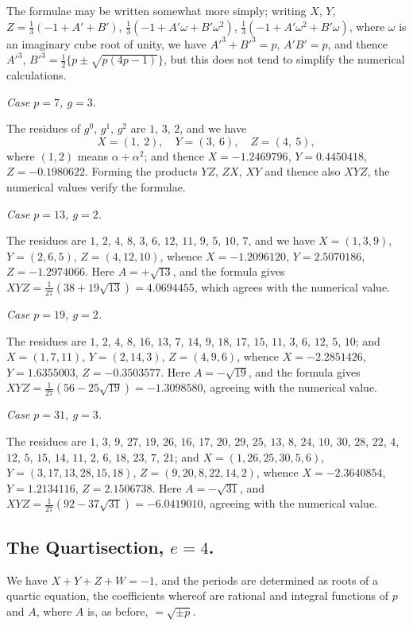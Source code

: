 \documentclass[12pt,a4paper]{article}
\theoremstyle{plain}
\begin{document}
The formulae may be written somewhat more simply; writing
$X$, $Y$, $Z = \frac{1}{3}(-1+A'+B')$, $\frac{1}{3}(-1+A'\omega+B'\omega^2)$,
$\frac{1}{3}(-1+A'\omega^2+B'\omega)$, where $\omega$ is an imaginary cube root of
unity, we have $A'^3+B'^3=p$, $A'B'=p$, and thence
$A'^3$, $B'^3 = \frac{1}{2}\{p \pm \sqrt{p(4p-1)}\}$, but this does not tend to
simplify the numerical calculations.

\textit{Case $p=7$, $g=3$.}

The residues of $g^0$, $g^1$, $g^2$ are $1$, $3$, $2$, and we have
\[
X = (1,\ 2),\quad Y = (3,\ 6),\quad Z = (4,\ 5),
\]
where $(1,2)$ means $\alpha+\alpha^2$; and thence $X=-1.2469796$,
$Y=0.4450418$, $Z=-0.1980622$. Forming the products $YZ$, $ZX$, $XY$
and thence also $XYZ$, the numerical values verify the formulae.

\textit{Case $p=13$, $g=2$.}

The residues are $1$, $2$, $4$, $8$, $3$, $6$, $12$, $11$, $9$, $5$, $10$, $7$,
and we have $X=(1,3,9)$, $Y=(2,6,5)$, $Z=(4,12,10)$, whence
$X=-1.2096120$, $Y=2.5070186$, $Z=-1.2974066$. Here $A=+\sqrt{13}$,
and the formula gives $XYZ=\frac{1}{27}(38+19\sqrt{13})=4.0694455$,
which agrees with the numerical value.

\textit{Case $p=19$, $g=2$.}

The residues are $1$, $2$, $4$, $8$, $16$, $13$, $7$, $14$, $9$, $18$, $17$,
$15$, $11$, $3$, $6$, $12$, $5$, $10$; and $X=(1,7,11)$, $Y=(2,14,3)$,
$Z=(4,9,6)$, whence $X=-2.2851426$, $Y=1.6355003$,
$Z=-0.3503577$. Here $A=-\sqrt{19}$, and the formula gives
$XYZ=\frac{1}{27}(56-25\sqrt{19})=-1.3098580$, agreeing with the numerical
value.

\textit{Case $p=31$, $g=3$.}

The residues are $1$, $3$, $9$, $27$, $19$, $26$, $16$, $17$, $20$, $29$,
$25$, $13$, $8$, $24$, $10$, $30$, $28$, $22$, $4$, $12$, $5$, $15$, $14$, $11$,
$2$, $6$, $18$, $23$, $7$, $21$; and $X=(1,26,25,30,5,6)$,
$Y=(3,17,13,28,15,18)$, $Z=(9,20,8,22,14,2)$, whence
$X=-2.3640854$, $Y=1.2134116$, $Z=2.1506738$. Here $A=-\sqrt{31}$,
and $XYZ=\frac{1}{27}(92-37\sqrt{31})=-6.0419010$, agreeing with the numerical
value.

\newpage
\subsection*{The Quartisection, $e=4$.}

We have $X+Y+Z+W=-1$, and the periods are determined as
roots of a quartic equation, the coefficients whereof are rational and
integral functions of $p$ and $A$, where $A$ is, as before, $=\sqrt{\pm p}$.
\end{document}
